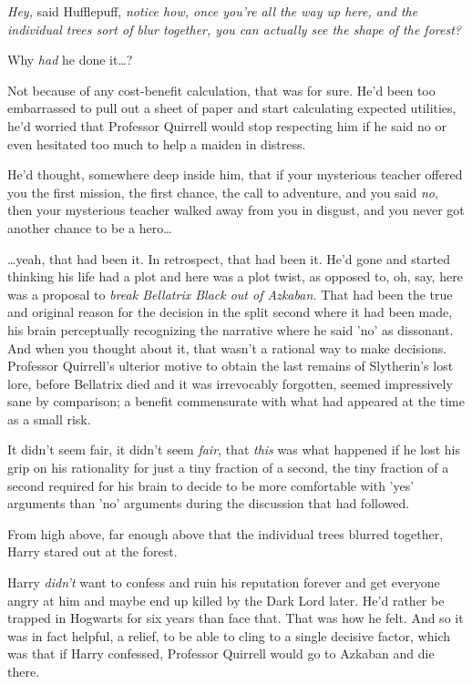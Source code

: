 \emph{Hey,} said Hufflepuff, \emph{notice how, once you're all the way up here, 
and the individual trees sort of blur together, you can actually see the shape 
of the forest?}

Why \emph{had} he done it{\ldots}?

Not because of any cost-benefit calculation, that was for sure. He'd been too 
embarrassed to pull out a sheet of paper and start calculating expected 
utilities, he'd worried that Professor Quirrell would stop respecting him if he 
said no or even hesitated too much to help a maiden in distress.

He'd thought, somewhere deep inside him, that if your mysterious teacher 
offered you the first mission, the first chance, the call to adventure, and you 
said\emph{ no}, then your mysterious teacher walked away from you in disgust, 
and you never got another chance to be a hero{\ldots}

{\ldots}yeah, that had been it. In retrospect, that had been it. He'd gone and 
started thinking his life had a plot and here was a plot twist, as opposed to, 
oh, say, here was a proposal to \emph{break Bellatrix Black out of Azkaban.} 
That had been the true and original reason for the decision in the split second 
where it had been made, his brain perceptually recognizing the narrative where 
he said 'no' as dissonant. And when you thought about it, that wasn't a 
rational way to make decisions. Professor Quirrell's ulterior motive to obtain 
the last remains of Slytherin's lost lore, before Bellatrix died and it was 
irrevocably forgotten, seemed impressively sane by comparison; a benefit 
commensurate with what had appeared at the time as a small risk.

It didn't seem fair, it didn't seem \emph{fair}, that \emph{this} was what 
happened if he lost his grip on his rationality for just a tiny fraction of a 
second, the tiny fraction of a second required for his brain to decide to be 
more comfortable with 'yes' arguments than 'no' arguments during the discussion 
that had followed.

From high above, far enough above that the individual trees blurred together, 
Harry stared out at the forest.

Harry \emph{didn't} want to confess and ruin his reputation forever and get 
everyone angry at him and maybe end up killed by the Dark Lord later. He'd 
rather be trapped in Hogwarts for six years than face that. That was how he 
felt. And so it was in fact helpful, a relief, to be able to cling to a single 
decisive factor, which was that if Harry confessed, Professor Quirrell would go 
to Azkaban and die there.


